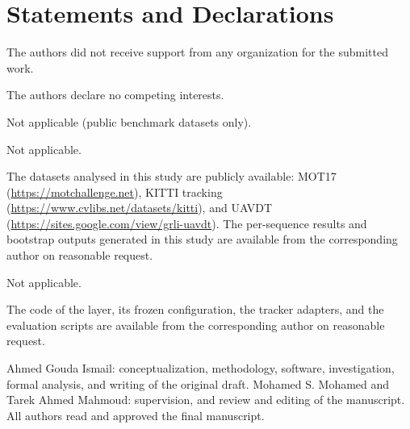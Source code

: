 \documentclass[pdflatex,sn-mathphys-num,iicol]{sn-jnl}
\begin{document}
\maketitle









\backmatter

\section*{Statements and Declarations}

The authors did not receive support from any organization for the submitted work.

The authors declare no competing interests.

Not applicable (public benchmark datasets only).

Not applicable.

The datasets analysed in this study are publicly available: MOT17
(\url{https://motchallenge.net}), KITTI tracking (\url{https://www.cvlibs.net/datasets/kitti}), and UAVDT
(\url{https://sites.google.com/view/grli-uavdt}).
The per-sequence results and bootstrap outputs generated in this study are available
from the corresponding author on reasonable request.

Not applicable.

The code of the layer, its frozen configuration, the tracker adapters, and the evaluation scripts
are available from the corresponding author on reasonable request.

Ahmed Gouda Ismail: conceptualization, methodology, software, investigation, formal analysis, and
writing of the original draft. Mohamed S. Mohamed and Tarek Ahmed Mahmoud: supervision, and
review and editing of the manuscript. All authors read and approved the final manuscript.


\end{document}
